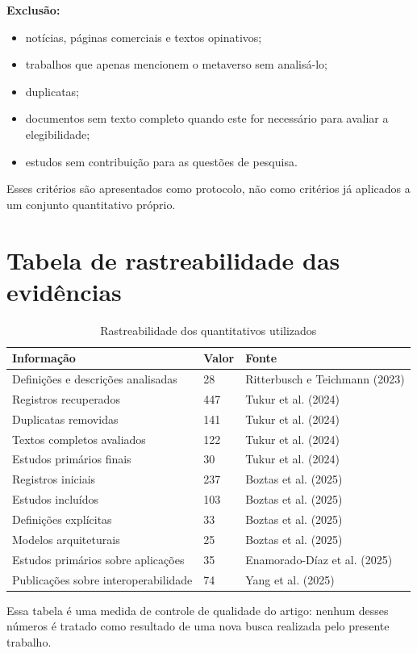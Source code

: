 \textbf{Exclusão:}
\begin{itemize}
    \item notícias, páginas comerciais e textos opinativos;
    \item trabalhos que apenas mencionem o metaverso sem analisá-lo;
    \item duplicatas;
    \item documentos sem texto completo quando este for necessário para avaliar a elegibilidade;
    \item estudos sem contribuição para as questões de pesquisa.
\end{itemize}

Esses critérios são apresentados como protocolo, não como critérios já aplicados a um conjunto quantitativo próprio.

\section{Tabela de rastreabilidade das evidências}

\begin{table}[H]
\centering
\caption{Rastreabilidade dos quantitativos utilizados}
\label{tab:rastreabilidade}
\begin{tabular}{p{}p{}p{}}
\toprule
\textbf{Informação} & \textbf{Valor} & \textbf{Fonte}\\
\midrule
Definições e descrições analisadas & 28 & Ritterbusch e Teichmann (2023)\\
Registros recuperados & 447 & Tukur et al. (2024)\\
Duplicatas removidas & 141 & Tukur et al. (2024)\\
Textos completos avaliados & 122 & Tukur et al. (2024)\\
Estudos primários finais & 30 & Tukur et al. (2024)\\
Registros iniciais & 237 & Boztas et al. (2025)\\
Estudos incluídos & 103 & Boztas et al. (2025)\\
Definições explícitas & 33 & Boztas et al. (2025)\\
Modelos arquiteturais & 25 & Boztas et al. (2025)\\
Estudos primários sobre aplicações & 35 & Enamorado-Díaz et al. (2025)\\
Publicações sobre interoperabilidade & 74 & Yang et al. (2025)\\
\bottomrule
\end{tabular}
\end{table}

Essa tabela é uma medida de controle de qualidade do artigo: nenhum desses números é tratado como resultado de uma nova busca realizada pelo presente trabalho.
